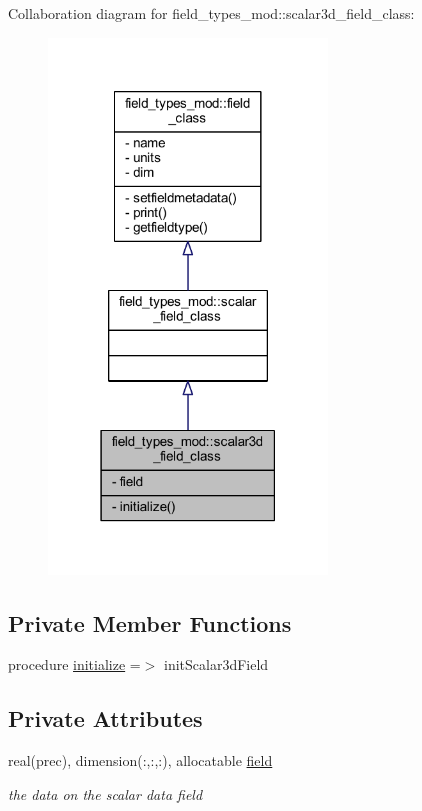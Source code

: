 Collaboration diagram for field\+\_\+types\+\_\+mod\+:\+:scalar3d\+\_\+field\+\_\+class\+:
\nopagebreak
\begin{figure}[H]
\begin{center}
\leavevmode
\includegraphics[width=210pt]{structfield__types__mod_1_1scalar3d__field__class__coll__graph}
\end{center}
\end{figure}
\subsection*{Private Member Functions}
\begin{DoxyCompactItemize}
\item 
procedure \mbox{\hyperlink{structfield__types__mod_1_1scalar3d__field__class_a696f26a0bb36050e98be62818c16d5bf}{initialize}} =$>$ init\+Scalar3d\+Field
\end{DoxyCompactItemize}
\subsection*{Private Attributes}
\begin{DoxyCompactItemize}
\item 
real(prec), dimension(\+:,\+:,\+:), allocatable \mbox{\hyperlink{structfield__types__mod_1_1scalar3d__field__class_a28c9545c33bace06357df925d03c7818}{field}}
\begin{DoxyCompactList}\small\item\em the data on the scalar data field \end{DoxyCompactList}\end{DoxyCompactItemize}


